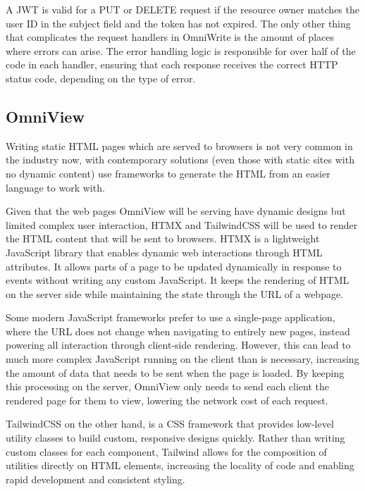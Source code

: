 A JWT is valid for a PUT or DELETE request if the resource owner matches the user ID in the subject field and the token has not expired.
The only other thing that complicates the request handlers in OmniWrite is the amount of places where errors can arise. 
The error handling logic is responsible for over half of the code in each handler, ensuring that each response receives the correct HTTP status code, depending on the type of error.

\subsection{OmniView}
Writing static HTML pages which are served to browsers is not very common in the industry now, with contemporary solutions (even those with static sites with no dynamic content) use frameworks to generate the HTML from an easier language to work with. 

Given that the web pages OmniView will be serving have dynamic designs but limited complex user interaction, HTMX and TailwindCSS will be used to render the HTML content that will be sent to browsers.
HTMX is a lightweight JavaScript library that enables dynamic web interactions through HTML attributes.
It allows parts of a page to be updated dynamically in response to events without writing any custom JavaScript. It keeps the rendering of HTML on the server side while maintaining the state through the URL of a webpage. 

Some modern JavaScript frameworks prefer to use a single-page application, where the URL does not change when navigating to entirely new pages, instead powering all interaction through client-side rendering.
However, this can lead to much more complex JavaScript running on the client than is necessary, increasing the amount of data that needs to be sent when the page is loaded.
By keeping this processing on the server, OmniView only needs to send each client the rendered page for them to view, lowering the network cost of each request. 

TailwindCSS on the other hand, is a CSS framework that provides low-level utility classes to build custom, responsive designs quickly.
Rather than writing custom classes for each component, Tailwind allows for the composition of utilities directly on HTML elements, increasing the locality of code and enabling rapid development and consistent styling. 



